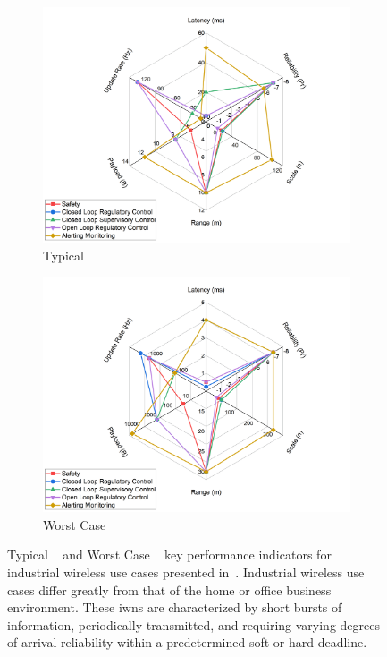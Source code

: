 \begin{figure}[!tbp]
	
	\centering
	\begin{subfigure}{.8\textwidth}
		\centering
		\includegraphics[width=.95\textwidth]{chapter-intro/diagrams/TypicalSpecs}  
		\caption{Typical}
		\label{intro:fig:typicalspecs}
	\end{subfigure}
	\begin{subfigure}{.8\textwidth}
		\centering
		\includegraphics[width=.95\textwidth]{chapter-intro/diagrams/WorstSpecs}  
		\caption{Worst Case}
		\label{intro:fig:worstspecs}
	\end{subfigure}
	\caption{
		Typical ~\protect{} and Worst Case ~\protect{} key performance indicators for industrial wireless use cases presented in~\cite{Montgomery2019}.  Industrial wireless use cases differ greatly from that of the home or office business environment.  These \glspl{iwn} are characterized by short bursts of information, periodically transmitted, and requiring varying degrees of arrival reliability within a predetermined soft or hard deadline.
	}
	\label{intro:fig:wirelesspecs}	
	
\end{figure}


